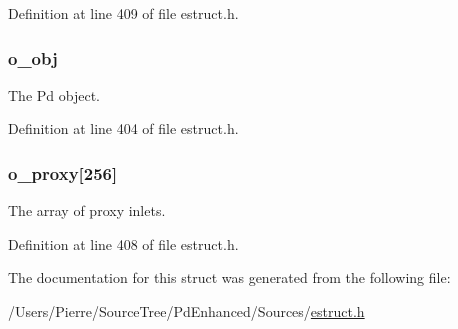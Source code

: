 Definition at line 409 of file estruct.\-h.

\hypertarget{struct__eobj_a8cffa8f3338cca7779ab922dab19227c}{
\subsubsection[{o\-\_\-obj}]{ o\-\_\-obj}}\label{struct__eobj_a8cffa8f3338cca7779ab922dab19227c}
The Pd object. 

Definition at line 404 of file estruct.\-h.

\hypertarget{struct__eobj_a9435dcf0a1aed105a4c38d24dfc65dbf}{
\subsubsection[{o\-\_\-proxy}]{ o\-\_\-proxy\mbox{[}256\mbox{]}}}\label{struct__eobj_a9435dcf0a1aed105a4c38d24dfc65dbf}
The array of proxy inlets. 

Definition at line 408 of file estruct.\-h.



The documentation for this struct was generated from the following file\-:\begin{DoxyCompactItemize}
\item 
/\-Users/\-Pierre/\-Source\-Tree/\-Pd\-Enhanced/\-Sources/\hyperlink{estruct_8h}{estruct.\-h}\end{DoxyCompactItemize}
